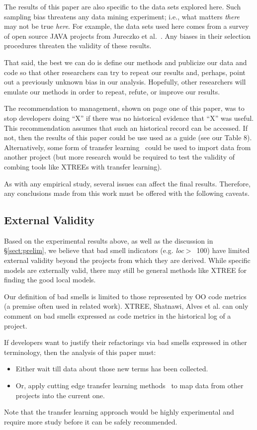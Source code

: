 \documentclass[twocolumn,5p]{elsarticle}
\newcommand{\tion}[1]{\S\ref{sect:#1}}
\theoremstyle{break}
\begin{document}
\begin{itemize}
The results of this paper are also specific to the data sets explored here.
Such sampling bias threatens any data mining experiment; i.e., what matters
{\em there} may not be true {\em here}. For example, the data sets used here comes from a survey of
open source JAVA projects from Jureczko et al.~\cite{jureczko10}. Any biases in their selection procedures
threaten the validity of these results. 

That said,
the best we can do is define our methods and publicize our data and code so that other researchers can
try to repeat our results and, perhaps, point out a previously unknown bias
in our analysis. Hopefully, other researchers will emulate our methods in
order to repeat, refute, or improve our results. 

The recommendation to management, shown on page one of this paper,  was to stop developers doing ``X'' if there was no historical evidence that ``X'' was useful. 
This recommendation assumes that such an  historical record can be accessed. If not,  then the results of this paper could be use used as a guide (see our Table 8). Alternatively, some form of transfer learning~\cite{Nam15,Jing15,krishna16} could be used to import data from another project (but more research would be required to test the validity of combing tools like XTREEs with transfer learning). 


		As with any empirical study, several issues can affect the final results. Therefore, any
		conclusions made from this work must be offered with the following
		caveats.
		
		\subsection{External Validity}
		Based on the experimental results above,
		as well as the discussion in \tion{prelim},
		we believe that bad smell indicators (e.g. \mbox{{\em loc}$>$ 100})
		have limited external validity beyond the projects from which they are derived. 
		While specific models are externally valid,
		there may still be general methods like XTREE for finding the good local models.  
		
		
		Our definition of bad smells is limited to those represented by OO code metrics (a premise often used in related work).   
		XTREE, Shatnawi, Alves et al. can  only comment
		on bad smells   expressed as code metrics 
		  in the historical log of a project. 
		
		
		If developers want to justify their refactorings
		via bad smells expressed in other terminology,
		then the  analysis of this paper must:
		\begin{itemize}
		    \item Either wait till 
		data about those new
		terms has been collected. 
		\item Or, apply cutting edge transfer learning
		methods~\cite{Nam15,Jing15} to map data from other projects
		into the current one.
		\end{itemize}
		Note that the transfer learning approach would
		be highly experimental and require more study
		before it can be safely recommended.
		

\end{itemize}
\end{document}
